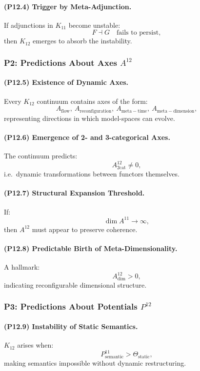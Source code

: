 \paragraph{(P12.4) Trigger by Meta-Adjunction.}
If adjunctions in $K_{11}$ become unstable:
\[
F \dashv G \quad\text{fails to persist},
\]
then $K_{12}$ emerges to absorb the instability.

\subsubsection{P2: Predictions About Axes $A^{12}$}

\paragraph{(P12.5) Existence of Dynamic Axes.}
Every $K_{12}$ continuum contains axes of the form:
\[
A_{\mathrm{flow}},\ A_{\mathrm{reconfiguration}},\
A_{\mathrm{meta-time}},\ A_{\mathrm{meta-dimension}},
\]
representing directions in which model-spaces can evolve.

\paragraph{(P12.6) Emergence of 2- and 3-categorical Axes.}
The continuum predicts:
\[
A_{\mathrm{2cat}}^{12} \neq 0,
\]
i.e.\ dynamic transformations between functors themselves.

\paragraph{(P12.7) Structural Expansion Threshold.}
If:
\[
\dim A^{11} \to \infty,
\]
then $A^{12}$ must appear to preserve coherence.

\paragraph{(P12.8) Predictable Birth of Meta-Dimensionality.}
A hallmark:
\[
A_{\mathrm{dim}}^{12} > 0,
\]
indicating reconfigurable dimensional structure.

\subsubsection{P3: Predictions About Potentials $P^{12}$}

\paragraph{(P12.9) Instability of Static Semantics.}
$K_{12}$ arises when:
\[
P_{\mathrm{semantic}}^{11} > \Theta_{\mathrm{static}},
\]
making semantics impossible without dynamic restructuring.

